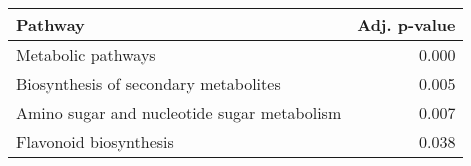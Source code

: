 \begin{tabular}{lr}
\toprule
                                     Pathway &  Adj. p-value \\
\midrule
                          Metabolic pathways &         0.000 \\
       Biosynthesis of secondary metabolites &         0.005 \\
 Amino sugar and nucleotide sugar metabolism &         0.007 \\
                      Flavonoid biosynthesis &         0.038 \\
\bottomrule
\end{tabular}
